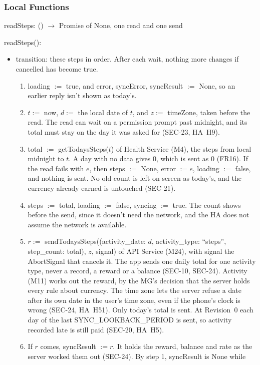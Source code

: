 \documentclass[12pt, titlepage]{article}
\begin{document}
\subsubsection{Local Functions}

\noindent readSteps: () $\rightarrow$ Promise of None, one read and one send

\medskip
\noindent readSteps():
\begin{itemize}
\item transition: these steps in order. After each wait, nothing more changes
  if cancelled has become true.
\begin{enumerate}
\item loading $:=$ true, and error, syncError, syncResult $:=$ None, so an
  earlier reply isn't shown as today's.
\item $t :=$ now, $d :=$ the local date of $t$, and $z :=$ timeZone, taken
  before the read. The read can wait on a permission prompt past midnight, and
  its total must stay on the day it was asked for (SEC-23, HA~H9).
\item total $:=$ getTodaysSteps($t$) of Health Service (M4), the steps from
  local midnight to $t$. A day with no data gives 0, which is sent as 0
  (FR16). If the read fails with $e$, then steps $:=$ None, error $:= e$,
  loading $:=$ false, and nothing is sent. No old count is left on screen as
  today's, and the currency already earned is untouched (SEC-21).
\item steps $:=$ total, loading $:=$ false, syncing $:=$ true. The count shows
  before the send, since it doesn't need the network, and the HA does not
  assume the network is available.
\item $r :=$ sendTodaysSteps((activity\_date: $d$, activity\_type:
  ``steps'', step\_count: total), $z$, signal) of API Service (M24), with
  signal the AbortSignal that cancels it. The app sends one daily total for
  one activity type, never a record, a reward or a balance (SEC-10, SEC-24).
  Activity (M11) works out the reward, by the MG's decision that the server
  holds every rule about currency. The time zone lets the server refuse a
  date after its own date in the user's time zone, even if the phone's clock
  is wrong (SEC-24, HA~H51). Only today's total is sent. At Revision~0 each
  day of the last SYNC\_LOOKBACK\_PERIOD is sent, so activity recorded late
  is still paid (SEC-20, HA~H5).
\item If $r$ comes, syncResult $:= r$. It holds the reward, balance and rate
  as the server worked them out (SEC-24). By step 1, syncResult is None while

\end{enumerate}
\end{itemize}
\end{document}
